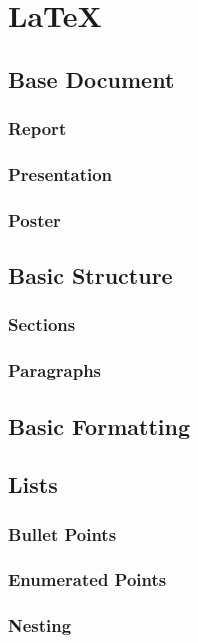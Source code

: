 \chapter{\LaTeX}
\label{latex}

\section{Base Document}

\subsection{Report}
\subsection{Presentation}
\subsection{Poster}

\section{Basic Structure}
\subsection{Sections}
\subsection{Paragraphs}

\section{Basic Formatting}

\section{Lists}
\subsection{Bullet Points}
\subsection{Enumerated Points}
\subsection{Nesting}


